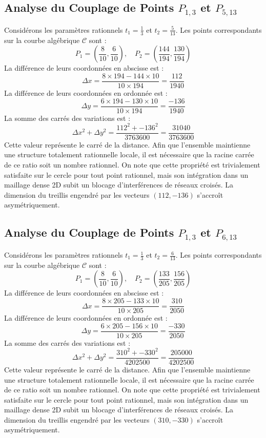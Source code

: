 \documentclass[12pt, a4paper]{article}
\begin{document}
\subsection{Analyse du Couplage de Points $P_{1,3}$ et $P_{5,13}$}
Considérons les paramètres rationnels $t_1 = \frac{1}{3}$ et $t_2 = \frac{5}{13}$.
Les points correspondants sur la courbe algébrique $\mathcal{C}$ sont :
$$ P_1 = \left( \frac{8}{10}, \frac{6}{10} \right), \quad P_2 = \left( \frac{144}{194}, \frac{130}{194} \right) $$
La différence de leurs coordonnées en abscisse est :
$$ \Delta x = \frac{8 \times 194 - 144 \times 10}{10 \times 194} = \frac{112}{1940} $$
La différence de leurs coordonnées en ordonnée est :
$$ \Delta y = \frac{6 \times 194 - 130 \times 10}{10 \times 194} = \frac{-136}{1940} $$
La somme des carrés des variations est :
$$ \Delta x^2 + \Delta y^2 = \frac{ 112^2 + -136^2 }{ 3763600 } = \frac{ 31040 }{ 3763600 } $$
Cette valeur représente le carré de la distance. Afin que l'ensemble maintienne une structure totalement rationnelle locale, il est nécessaire que la racine carrée de ce ratio soit un nombre rationnel. On note que cette propriété est trivialement satisfaite sur le cercle pour tout point rationnel, mais son intégration dans un maillage dense 2D subit un blocage d'interférences de réseaux croisés. La dimension du treillis engendré par les vecteurs $( 112, -136 )$ s'accroît asymétriquement.


\subsection{Analyse du Couplage de Points $P_{1,3}$ et $P_{6,13}$}
Considérons les paramètres rationnels $t_1 = \frac{1}{3}$ et $t_2 = \frac{6}{13}$.
Les points correspondants sur la courbe algébrique $\mathcal{C}$ sont :
$$ P_1 = \left( \frac{8}{10}, \frac{6}{10} \right), \quad P_2 = \left( \frac{133}{205}, \frac{156}{205} \right) $$
La différence de leurs coordonnées en abscisse est :
$$ \Delta x = \frac{8 \times 205 - 133 \times 10}{10 \times 205} = \frac{310}{2050} $$
La différence de leurs coordonnées en ordonnée est :
$$ \Delta y = \frac{6 \times 205 - 156 \times 10}{10 \times 205} = \frac{-330}{2050} $$
La somme des carrés des variations est :
$$ \Delta x^2 + \Delta y^2 = \frac{ 310^2 + -330^2 }{ 4202500 } = \frac{ 205000 }{ 4202500 } $$
Cette valeur représente le carré de la distance. Afin que l'ensemble maintienne une structure totalement rationnelle locale, il est nécessaire que la racine carrée de ce ratio soit un nombre rationnel. On note que cette propriété est trivialement satisfaite sur le cercle pour tout point rationnel, mais son intégration dans un maillage dense 2D subit un blocage d'interférences de réseaux croisés. La dimension du treillis engendré par les vecteurs $( 310, -330 )$ s'accroît asymétriquement.
\end{document}
